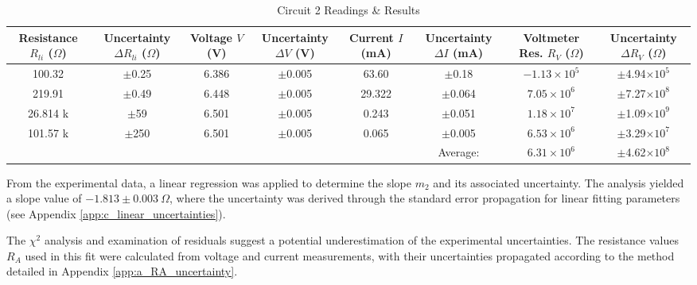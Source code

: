 \documentclass{article} %
\begin{document}
\begin{table}[htbp]
\centering
\caption{Circuit 2 Readings \& Results}
\begin{tabular}{|c|c|c|c|c|c|c|c|}
\hline
\makecell{Resistance \\ $R_{li}$ ($\Omega$)} & \makecell{Uncertainty \\ $\Delta R_{li}$ ($\Omega$)} & \makecell{Voltage \\ $V$ (V)} & \makecell{Uncertainty \\ $\Delta V$ (V)} & \makecell{Current \\ $I$ (mA)} & \makecell{Uncertainty \\ $\Delta I$ (mA)} & \makecell{Voltmeter Res. \\ $R_V$ ($\Omega$)} & \makecell{Uncertainty \\ $\Delta R_V$ ($\Omega$)} \\
\hline
100.32 & $\pm$0.25 & 6.386 & $\pm$0.005 & 63.60 & $\pm$0.18 & $-1.13 \times 10^5$ & $\pm$4.94$\times 10^5$ \\
\hline
219.91 & $\pm$0.49 & 6.448 & $\pm$0.005 & 29.322 & $\pm$0.064 & $7.05 \times 10^6$ & $\pm$7.27$\times 10^8$ \\
\hline
26.814 k & $\pm$59 & 6.501 & $\pm$0.005 & 0.243 & $\pm$0.051 & $1.18 \times 10^7$ & $\pm$1.09$\times 10^9$ \\
\hline
101.57 k & $\pm$250 & 6.501 & $\pm$0.005 & 0.065 & $\pm$0.005 & $6.53 \times 10^6$ & $\pm$3.29$\times 10^7$ \\
\hline
\cellcolor{gray!50} & \cellcolor{gray!50} & \cellcolor{gray!50} & \cellcolor{gray!50} & \cellcolor{gray!50} & Average: & $6.31 \times 10^6$ & $\pm$4.62$\times 10^8$ \\
\hline
\end{tabular}
\end{table}

From the experimental data, a linear regression was applied to determine the slope $m_2$ and its associated uncertainty. 
The analysis yielded a slope value of $-1.813 \pm 0.003~\Omega$, where the uncertainty was derived through the standard error propagation for linear fitting parameters (see Appendix \ref{app:c_linear_uncertainties}).

The $\chi^2$ analysis and examination of residuals suggest a potential underestimation of the experimental uncertainties. 
The resistance values $R_A$ used in this fit were calculated from voltage and current measurements, with their uncertainties propagated according to the method detailed in Appendix \ref{app:a_RA_uncertainty}.
\end{document}
